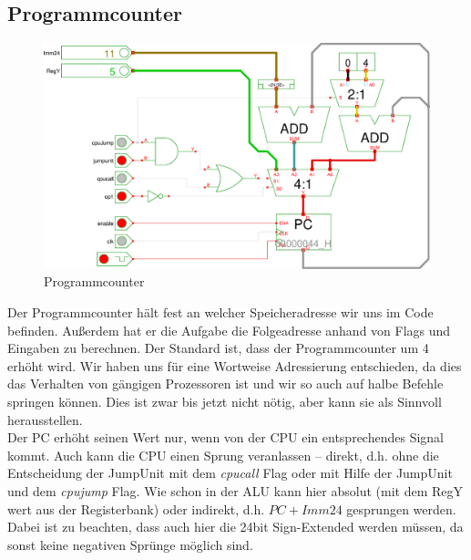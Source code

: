 \subsection{Programmcounter}
\begin{figure}[!ht]
\centering
\includegraphics[width=1\textwidth]{images/pc.eps}
\caption{\label{HW:PC}Programmcounter}
\end{figure}
Der Programmcounter hält fest an welcher Speicheradresse wir uns im Code befinden. Außerdem hat er die Aufgabe die Folgeadresse anhand von Flags und Eingaben zu berechnen.
Der Standard ist, dass der Programmcounter um 4 erhöht wird. Wir haben uns für eine Wortweise Adressierung entschieden, da dies das Verhalten von gängigen Prozessoren ist und wir so auch auf halbe Befehle springen können. Dies ist zwar bis jetzt nicht nötig, aber kann sie als Sinnvoll herausstellen.\\
Der PC erhöht seinen Wert nur, wenn von der CPU ein entsprechendes Signal kommt. Auch kann die CPU einen Sprung veranlassen -- direkt, d.h. ohne die Entscheidung der JumpUnit mit dem \emph{cpucall} Flag oder mit Hilfe der JumpUnit und dem \emph{cpujump} Flag. Wie schon in der ALU kann hier absolut (mit dem RegY wert aus der Registerbank) oder indirekt, d.h. $PC+Imm24$ gesprungen werden. Dabei ist zu beachten, dass auch hier die 24bit Sign-Extended werden müssen, da sonst keine negativen Sprünge möglich sind.

